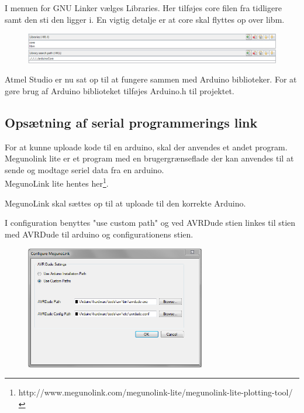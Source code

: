 I menuen for GNU Linker vælges Libraries. Her tilføjes core filen fra tidligere samt den sti den ligger i. En vigtig detalje er at core skal flyttes op over libm.
\begin{figure}[H]
	\centering
	\includegraphics[width=1\textwidth]{Billeder/implementation/Howtoguide/atmel_linker.png}
\end{figure}

Atmel Studio er nu sat op til at fungere sammen med Arduino biblioteker. For at gøre brug af Arduino biblioteket tilføjes Arduino.h til projektet.


\subsection{Opsætning af serial programmerings link}

For at kunne uploade kode til en arduino, skal der anvendes et andet program.
Megunolink lite er et program med en brugergrænseflade der kan anvendes til at sende og modtage seriel data fra en arduino.\\
MegunoLink lite hentes her\footnote{http://www.megunolink.com/megunolink-lite/megunolink-lite-plotting-tool/}.

MegunoLink skal sættes op til at uploade til den korrekte Arduino. 

I configuration benyttes "use custom path" og ved AVRDude stien linkes til stien med AVRDude til arduino og configurationens stien. 

\begin{figure}[H]
	\centering
	\includegraphics[width=0.7\textwidth]{Billeder/implementation/Howtoguide/megunolink_config.png}
\end{figure}

